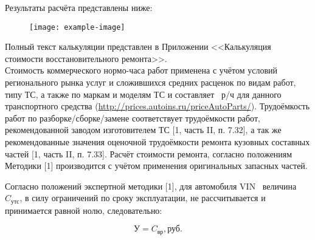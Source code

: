\indent Результаты расчёта представлены ниже:
\vspace{3mm}
%
\begin{figure}[H]
	\centering
	\texttt{[image: example-image]}
\end{figure}
\medskip
\renewcommand\baselinestretch{1.2}\small\normalsize
Полный текст калькуляции представлен в Приложении  <<Калькуляция стоимости восстановительного ремонта>>.\\ 
Стоимость коммерческого нормо-часа работ применена  с учётом условий регионального рынка услуг и сложившихся средних расценок по видам работ, типу ТС, а также по маркам и моделям ТС  и   составляет  \, р/ч для данного транспортного средства (\url{http://prices.autoins.ru/priceAutoParts/}). Трудоёмкость работ по разборке/сборке/замене  соответствует трудоёмкости работ, рекомендованной заводом изготовителем ТС [1, часть II, п. 7.32], а так же рекомендованные значения оценочной трудоёмкости ремонта кузовных составных частей [1, часть II, п. 7.33]. Расчёт стоимости ремонта, согласно положениям Методики [1] производится с учётом  применения оригинальных запасных частей. %

Согласно положений экспертной методики [1],  для  автомобиля VIN  \vin \, величина $ C_\text{утс} $,  в силу ограничений по сроку эксплуатации, не рассчитывается и принимается равной нолю, следовательно:

\begin{equation}\label{112}
	\text{У} = C_\text{вр},    \text{руб.}
\end{equation}


